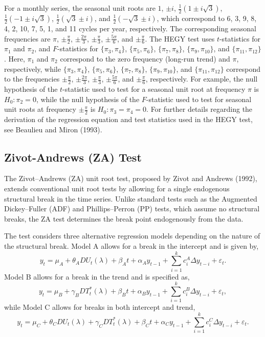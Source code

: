 \documentclass[12pt]{article}
\begin{document}
 \vspace{0.75cm}
 
 For a monthly series, the seasonal unit roots are \(1\), \(\pm i\), \(\frac{1}{2}(1 \pm i\sqrt{3})\), \(\frac{1}{2}(-1 \pm i\sqrt{3})\), \(\frac{1}{2}(\sqrt{3} \pm i)\), and \(\frac{1}{2}(-\sqrt{3} \pm i)\), which correspond to 6, 3, 9, 8, 4, 2, 10, 7, 5, 1, and 11 cycles per year, respectively. The corresponding seasonal frequencies are \(\pi\), \(\pm\frac{\pi}{2}\), \(\pm\frac{2\pi}{3}\), \(\pm\frac{\pi}{3}\), \(\pm\frac{5\pi}{6}\), and \(\pm\frac{\pi}{6}\). The HEGY test uses \(t\)-statistics for \(\pi_1\) and \(\pi_2\), and \(F\)-statistics for \(\{\pi_3,\pi_4\}\), \(\{\pi_5,\pi_6\}\), \(\{\pi_7,\pi_8\}\), \(\{\pi_9,\pi_{10}\}\), and \(\{\pi_{11},\pi_{12}\}\). Here, \(\pi_1\) and \(\pi_2\) correspond to the zero frequency (long-run trend) and \(\pi\), respectively, while \(\{\pi_3,\pi_4\}\), \(\{\pi_5,\pi_6\}\), \(\{\pi_7,\pi_8\}\), \(\{\pi_9,\pi_{10}\}\), and \(\{\pi_{11},\pi_{12}\}\) correspond to the frequencies \(\pm\frac{\pi}{2}\), \(\pm\frac{2\pi}{3}\), \(\pm\frac{\pi}{3}\), \(\pm\frac{5\pi}{6}\), and \(\pm\frac{\pi}{6}\), respectively. For example, the null hypothesis of the \(t\)-statistic used to test for a seasonal unit root at frequency \(\pi\) is \(H_0:\pi_2=0\), while the null hypothesis of the \(F\)-statistic used to test for seasonal unit roots at frequency \(\pm\frac{\pi}{2}\) is \(H_0:\pi_3=\pi_4=0\). For further details regarding the derivation of the regression equation and test statistics used in the HEGY test, see Beaulieu and Miron (1993).

\subsection{Zivot-Andrews (ZA) Test}

The Zivot--Andrews (ZA) unit root test, proposed by Zivot and Andrews (1992), extends conventional unit root tests by allowing for a single endogenous structural break in the time series. Unlike standard tests such as the Augmented Dickey--Fuller (ADF) and Phillips--Perron (PP) tests, which assume no structural breaks, the ZA test determines the break point endogenously from the data.

\vspace{0.75cm}

The test considers three alternative regression models depending on the nature of the structural break. Model A allows for a break in the intercept and is given by,
\[
y_t = \mu_A + \theta_A DU_t(\lambda) + \beta_A t + \alpha_A y_{t-1}
+ \sum_{i=1}^{k} c_i^{A} \Delta y_{t-i} + \varepsilon_t.
\]
Model B allows for a break in the trend and is specified as,
\[
y_t = \mu_B + \gamma_B DT_t^{*}(\lambda) + \beta_B t + \alpha_B y_{t-1}
+ \sum_{i=1}^{k} c_i^{B} \Delta y_{t-i} + \varepsilon_t,
\]
while Model C allows for breaks in both intercept and trend,
\[
y_t = \mu_C + \theta_C DU_t(\lambda) + \gamma_C DT_t^{*}(\lambda) + \beta_C t + \alpha_C y_{t-1}
+ \sum_{i=1}^{k} c_i^{C} \Delta y_{t-i} + \varepsilon_t.
\]
\end{document}
